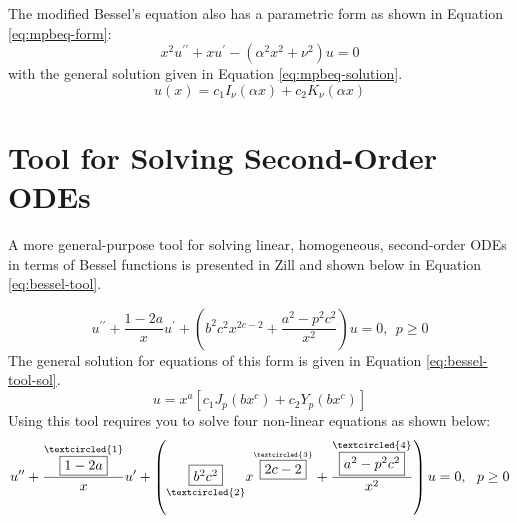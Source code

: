 The modified Bessel's equation also has a parametric form as shown in Equation \ref{eq:mpbeq-form}:
\begin{equation}
x^2u^{\prime \prime} + xu^{\prime} - \left(\alpha^2 x^2 + \nu^2 \right)u = 0
\label{eq:mpbeq-form}
\end{equation}
with the general solution given in Equation \ref{eq:mpbeq-solution}.
\begin{equation}
u(x) = c_1I_{\nu}(\alpha x) + c_2 K_{\nu}(\alpha x)
\label{eq:mpbeq-solution}
\end{equation}

\vspace{5.0cm}

\section{Tool for Solving Second-Order ODEs}
A more general-purpose tool for solving linear, homogeneous, second-order ODEs in terms of Bessel functions is presented in Zill\cite{zill2020advanced} and shown below in Equation \ref{eq:bessel-tool}.

\begin{equation}
u^{\prime \prime} + \frac{1-2a}{x}u^{\prime} + \left(b^2 c^2 x^{2c-2} + \frac{a^2-p^2c^2}{x^2} \right)u = 0, \ \ p \ge 0
\label{eq:bessel-tool}
\end{equation}
The general solution for equations of this form is given in Equation \ref{eq:bessel-tool-sol}.
\begin{equation}
u = x^a\left[c_1 J_{p}\left(bx^c \right)+c_2Y_{p}\left(bx^c \right) \right]
\label{eq:bessel-tool-sol}
\end{equation}
Using this tool requires you to solve four non-linear equations as shown below:
\begin{equation*}
u^{\prime \prime} + \frac{\overset{\textcircled{1}}{\fbox{$1-2a$}}}{x}u^{\prime} + \left(\underset{\textcircled{2}}{\fbox{$b^2 c^2$}} x^{\overset{\textcircled{3}}{\fbox{$2c-2$}}} + \frac{\overset{\textcircled{4}}{\fbox{$a^2-p^2c^2$}}}{x^2} \right)u = 0, \ \ p \ge 0
\end{equation*}

